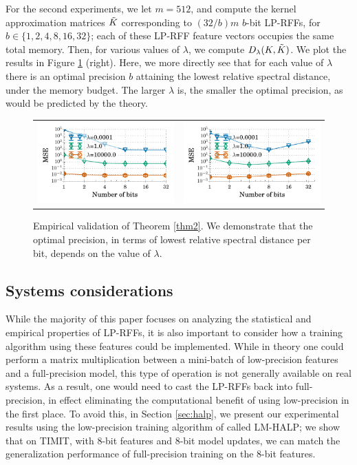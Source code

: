 For the second experiments, we let $m = 512$, and compute the kernel approximation matrices $\tilde{K}$ corresponding to $(32/b)m$ $b$-bit LP-RFFs, for $b \in \{1,2,4,8,16,32\}$; each of these LP-RFF feature vectors occupies the same total memory. Then, for various values of $\lambda$, we compute $D_{\lambda}(K,\tilde{K})$. We plot the results in Figure \ref{fig:theo_validation} (right). Here, we more directly see that for each value of $\lambda$ there is an optimal precision $b$ attaining the lowest relative spectral distance, under the memory budget.  The larger $\lambda$ is, the smaller the optimal precision, as would be predicted by the theory.

\begin{figure}
	\centering
	\begin{tabular}{c c}
		\includegraphics[width=0.4\linewidth]{figures/theory_fixed_n_feat.pdf} &
		\includegraphics[width=0.4\linewidth]{figures/theory_fixed_memory.pdf} 
	\end{tabular}
	\caption{Empirical validation of Theorem \ref{thm2}.  We demonstrate that the optimal precision, in terms of lowest relative spectral distance per bit, depends on the value of $\lambda$.}
	\label{fig:theo_validation}
\end{figure}

\subsection{Systems considerations}
While the majority of this paper focuses on analyzing the statistical and empirical properties of LP-RFFs, it is also important to consider how a training algorithm using these features could be implemented. While in theory one could perform a matrix multiplication between a mini-batch of low-precision features and a full-precision model, this type of operation is not generally available on real systems. As a result, one would need to cast the LP-RFFs back into full-precision, in effect eliminating the computational benefit of using low-precision in the first place.  To avoid this, in Section \ref{sec:halp}, we present our experimental results using the low-precision training algorithm of \citet{halp18} called LM-HALP; we show that on TIMIT, with 8-bit features and 8-bit model updates, we can match the generalization performance of full-precision training on the 8-bit features.

